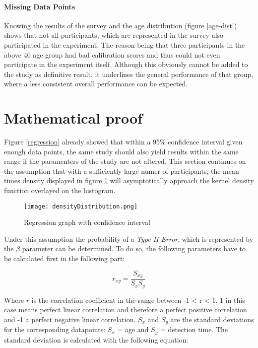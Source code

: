             \paragraph{Missing Data Points} Knowing the results of the survey and the age distribution (figure \ref*{age-dist}) shows that not all participants, which are represented in the survey also participated in the experiment. The reason being that three participants in the above 40 age group had bad calibration scores and thus could not even participate in the experiment itself. Although this obviously cannot be added to the study as definitive result, it underlines the general performance of that group, where a less consistent overall performance can be expected.

        \section{Mathematical proof}\label{mafs}

            Figure \ref*{regression} already showed that within a 95\% confidence interval given enough data points, the same study should also yield results within the same range if the paramenters of the study are not altered. This section continues on the assumption that with a sufficiently large numer of participants, the mean times density displayed in figure \ref*{means-density} will asymptotically approach the kernel density function overlayed on the histogram. 

            \begin{figure}[h]     %
                \centering
                \texttt{[image: densityDistribution.png]}
                \caption{Regression graph with confidence interval}\label{means-density}
            \end{figure}

            Under this assumption the probability of a \textit{Type II Error}, which is represented by the $\beta$ parameter can be determined. To do so, the following parameters have to be calculated first in the following part:

            \begin{equation}\label{r-formula}
                r_{xy} = \frac{S_{xy}}{S_{x}S_{y}}
            \end{equation}

            Where $r$ is the correlation coefficient in the range between -1 < r < 1. 1 in this case means perfect linear correlation and therefore a perfect positive correlation and -1 a perfect negative linear correlation. $S_{x}$ and $S_{y}$ are the standard deviations for the corresponding datapoints: $S_{x}$ = age and $S_{y}$ = detection time. 
            The standard deviation is calculated with the following equation:

